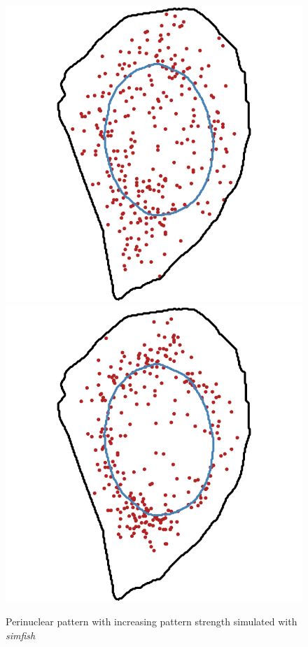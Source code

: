 \begin{figure}[h]
		\includegraphics[width=\linewidth]{figures/chapter4/simulation_perinuclear_50}
	\endminipage\hfill
		\includegraphics[width=\linewidth]{figures/chapter4/simulation_perinuclear_90}
	\endminipage
	\caption{Perinuclear pattern with increasing pattern strength simulated with \emph{simfish}}
	\label{fig:perinuclear_panel}
\end{figure}

